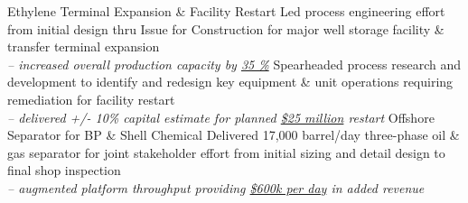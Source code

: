 %
%
%
%
%
\justifiedsubsection%
%
{Ethylene Terminal Expansion \& Facility Restart}
{}
%
\workitemsTwo%
%
{Led process engineering effort from initial design thru Issue for Construction for major well storage facility \& transfer terminal expansion 
\\\textit{-- increased overall production capacity by \underline{35 \%}}}
{Spearheaded process research and development to identify and redesign key equipment \& unit operations requiring remediation for facility restart
\\\textit{-- delivered +/- 10\% capital estimate for planned \underline{\$25 million} restart}}
%
%
%
%
\justifiedsubsection%
%
{Offshore Separator for BP \& Shell Chemical}
{}
%
\workitemsOne%
%
{Delivered 17,000 barrel/day three-phase oil \& gas separator for joint stakeholder effort from initial sizing and detail design to final shop inspection
\\\textit{-- augmented platform throughput providing \underline{\$600k per day} in added revenue}}
%
%
%
%
